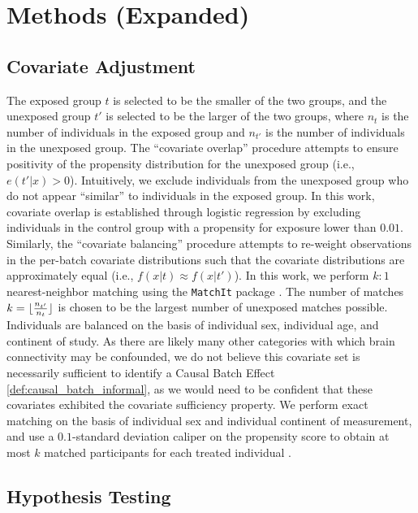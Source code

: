 \section{Methods (Expanded)}

\label{sec:notnovel_methods}

\subsection{Covariate Adjustment}
\label{sec:covar_adjustment}
The exposed group $t$ is selected to be the smaller of the two groups, and the unexposed group $t'$ is selected to be the larger of the two groups, where $n_t$ is the number of individuals in the exposed group and $n_{t'}$ is the number of individuals in the unexposed group. The ``covariate overlap'' procedure attempts to ensure positivity of the propensity distribution for the unexposed group (i.e., $e(t'|x) > 0$). Intuitively, we exclude individuals from the unexposed group who do not appear ``similar'' to individuals in the exposed group. In this work, covariate overlap is established through logistic regression by excluding individuals in the control group with a propensity for exposure lower than $0.01$. Similarly, the ``covariate balancing'' procedure attempts to re-weight observations in the per-batch covariate distributions such that the covariate distributions are approximately equal (i.e., $f(x|t) \approx f(x|t')$). In this work, we perform $k:1$ nearest-neighbor matching using the \texttt{MatchIt} package \cite{matchit}. The number of matches $k = \lfloor\frac{n_{t'}}{n_t}\rfloor$ is chosen to be the largest number of unexposed matches possible. Individuals are balanced on the basis of individual sex, individual age, and continent of study. As there are likely many other categories with which brain connectivity may be confounded, we do not believe this covariate set is necessarily sufficient to identify a Causal Batch Effect \ref{def:causal_batch_informal}, as we would need to be confident that these covariates exhibited the covariate sufficiency property. We perform exact matching on the basis of individual sex and individual continent of measurement, and use a $0.1$-standard deviation caliper on the propensity score to obtain at most $k$ matched participants for each treated individual \cite{Powell2020Sep}.

\subsection{Hypothesis Testing}

